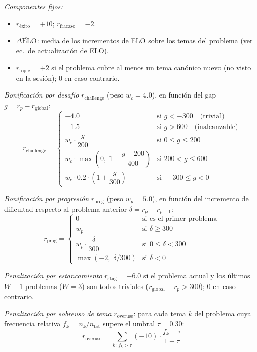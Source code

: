 \documentclass[12pt, a4paper]{article}
\begin{document}
\textit{Componentes fijos:}
\begin{itemize}
  \item $r_{\text{éxito}} = +10$; \quad $r_{\text{fracaso}} = -2$.
  \item $\overline{\Delta\text{ELO}}$: media de los incrementos de ELO sobre
    los temas del problema (ver ec.\ de actualización de ELO).
  \item $r_{\text{topic}} = +2$ si el problema cubre al menos un tema
    canónico nuevo (no visto en la sesión); $0$ en caso contrario.
\end{itemize}
 
\textit{Bonificación por desafío} $r_{\text{challenge}}$
(peso $w_c = 4.0$), en función del gap $g = r_p - r_{\text{global}}$:
\[
  r_{\text{challenge}} =
  \begin{cases}
    -4.0 & \text{si } g < -300 \quad \text{(trivial)} \\
    -1.5 & \text{si } g > 600  \quad \text{(inalcanzable)} \\
    w_c \cdot \dfrac{g}{200}
      & \text{si } 0 \le g \le 200 \\
    w_c \cdot \max\!\left(0,\; 1 - \dfrac{g - 200}{400}\right)
      & \text{si } 200 < g \le 600 \\
    w_c \cdot 0.2 \cdot \left(1 + \dfrac{g}{300}\right)
      & \text{si } -300 \le g < 0
  \end{cases}
\]
 
\textit{Bonificación por progresión} $r_{\text{prog}}$
(peso $w_p = 5.0$), en función del incremento de dificultad respecto al
problema anterior $\delta = r_p - r_{p-1}$:
\[
  r_{\text{prog}} =
  \begin{cases}
    0 & \text{si es el primer problema} \\
    w_p & \text{si } \delta \ge 300 \\
    w_p \cdot \dfrac{\delta}{300} & \text{si } 0 \le \delta < 300 \\
    \max(-2,\; \delta / 300) & \text{si } \delta < 0
  \end{cases}
\]
 
\textit{Penalización por estancamiento} $r_{\text{stag}} = -6.0$ si el
problema actual y los últimos $W-1$ problemas ($W=3$) son todos triviales
($r_{\text{global}} - r_p > 300$); $0$ en caso contrario.
 
\textit{Penalización por sobreuso de tema} $r_{\text{overuse}}$: para cada
tema $k$ del problema cuya frecuencia relativa $f_k = n_k / n_{\text{tot}}$
supere el umbral $\tau = 0.30$:
\[
  r_{\text{overuse}} = \sum_{k:\, f_k > \tau}
    (-10) \cdot \frac{f_k - \tau}{1 - \tau}
\]
 
\end{document}

